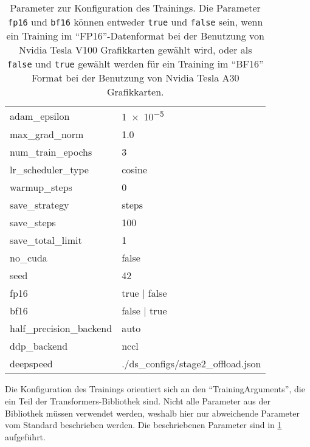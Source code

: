 \begin{table}
\begin{tabular}{ll}
        adam\_epsilon                   & \num{1e-5}                         \\
        max\_grad\_norm                 & \SI{1.0}{}                         \\
        num\_train\_epochs              & 3                                  \\
        lr\_scheduler\_type             & cosine                             \\
        warmup\_steps                   & 0                                  \\
        save\_strategy                  & steps                              \\
        save\_steps                     & 100                                \\
        save\_total\_limit              & 1                                  \\
        no\_cuda                        & false                              \\
        seed                            & 42                                 \\
        fp16                            & true | false                       \\
        bf16                            & false | true                       \\
        half\_precision\_backend        & auto                               \\
        ddp\_backend                    & nccl                               \\
        deepspeed                       & ./ds\_configs/stage2\_offload.json \\
        \bottomrule
    \end{tabular}
    \caption[Parameter zur Konfiguration des Trainings]{Parameter zur Konfiguration des Trainings.
        Die Parameter \texttt{fp16} und \texttt{bf16} können entweder \texttt{true} und \texttt{false} sein, wenn ein Training im \enquote{FP16}-Datenformat bei der Benutzung von Nvidia Tesla V100 Grafikkarten gewählt wird, oder als \texttt{false} und \texttt{true} gewählt werden für ein Training im \enquote{BF16} Format bei der Benutzung von Nvidia Tesla A30 Grafikkarten.}\label{tab:training-config}
\end{table}
Die Konfiguration des Trainings orientiert sich an den \enquote{TrainingArguments}, die ein Teil der Transformers-Bibliothek sind.
Nicht alle Parameter aus der Bibliothek müssen verwendet werden, weshalb hier nur abweichende Parameter vom Standard beschrieben werden.
Die beschriebenen Parameter sind in \cref{tab:training-config} aufgeführt.\\

